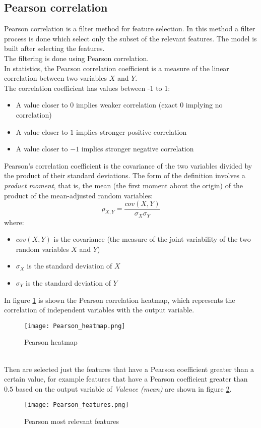 \subsection{Pearson correlation}
Pearson correlation is a filter method for feature selection. In this method a filter process is done which select only the subset of the relevant features. The model is built after selecting the features.
\\
The filtering is done using Pearson correlation.
\\ \indent
In statistics, the Pearson correlation coefficient is a measure of the linear correlation between two variables $X$ and $Y$.
\\
The correlation coefficient has values between -1 to 1:
\begin{itemize}
	\item A value closer to $0$ implies weaker correlation (exact $0$ implying no correlation)
	\item A value closer to $1$ implies stronger positive correlation
	\item A value closer to $-1$ implies stronger negative correlation
\end{itemize}
Pearson's correlation coefficient is the covariance of the two variables divided by the product of their standard deviations. The form of the definition involves a \textit{product moment}, that is, the mean (the first moment about the origin) of the product of the mean-adjusted random variables:
\begin{equation}
	\rho_{X,Y}=\dfrac{cov(X,Y)}{\sigma_X \sigma_Y}
\end{equation}
where:
\begin{itemize}
	\item $cov(X,Y)$ is the covariance (the measure of the joint variability of the two random variables $X$ and $Y$)
	\item $\sigma_X$ is the standard deviation of $X$
	\item $\sigma_Y$ is the standard deviation of $Y$
\end{itemize}
In figure \ref{fig:Pearson_heatmap} is shown the Pearson correlation heatmap, which represents the correlation of independent variables with the output variable.
\begin{figure}[h]
    \centering
    \texttt{[image: Pearson\_heatmap.png]} 
	\caption{Pearson heatmap}
    \label{fig:Pearson_heatmap}
\end{figure}
\\
Then are selected just the features that have a Pearson coefficient greater than a certain value, for example features that have a Pearson coefficient greater than $0.5$ based on the output variable of \textit{Valence (mean)} are shown in figure \ref{fig:Pearson_features}.
\begin{figure}[h]
    \centering
    \texttt{[image: Pearson\_features.png]} 
	\caption{Pearson most relevant features}
    \label{fig:Pearson_features}
\end{figure}

